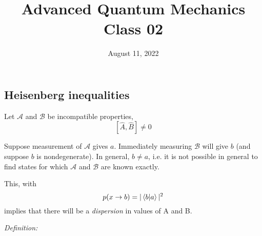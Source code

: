 \documentclass[12pt]{article}
\title{Advanced Quantum Mechanics\\Class 02}
\date{August 11, 2022}                                           %
\begin{document}
\maketitle

\setcounter{section}{3}
\setcounter{equation}{15}
\setcounter{subsection}{1}


\subsection{Heisenberg inequalities}

Let $\mathcal{A}$ and $\mathcal{B}$ be incompatible properties,
\[
[\hat{A}, \hat{B}] \neq 0
\]

Suppose measurement of $\mathcal{A}$ gives $a$. Immediately
measuring $\mathcal{B}$ will give $b$ (and suppose $b$ is nondegenerate). 
In general, $b \neq a$, i.e.
it is not possible in general to find states for which $\mathcal{A}$ and $\mathcal{B}$ are known exactly. 


This, with
\[
p(x \rightarrow b)=| \bra{b}\ket{a} |^{2}
\]
implies that there will be a \emph{dispersion} in values of A and B.

\emph{Definition:}
\end{document}
